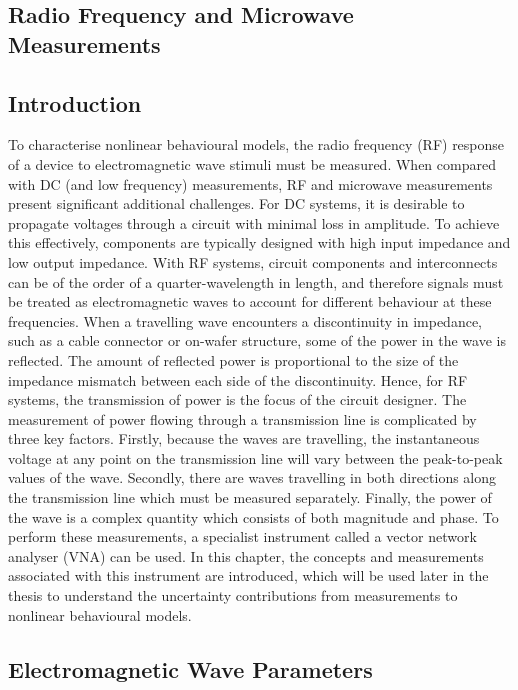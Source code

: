 \documentclass[../thesis.tex]{subfiles}
\begin{document}
\begin{refsection}
\setcounter{chapter}{1}
\chapter{Radio Frequency and Microwave \\Measurements}
\section{Introduction}

To characterise nonlinear behavioural models, the radio frequency (RF) response of a device to electromagnetic wave stimuli must be measured. When compared with DC (and low frequency) measurements, RF and microwave measurements present significant additional challenges. 
For DC systems, it is desirable to propagate voltages through a circuit with minimal loss in amplitude. To achieve this effectively, components are typically designed with high input impedance and low output impedance. With RF systems, circuit components and interconnects can be of the order of a quarter-wavelength in length, and therefore signals must be treated as electromagnetic waves to account for different behaviour at these frequencies.
When a travelling wave encounters a discontinuity in impedance, such as a cable connector or on-wafer structure, some of the power in the wave is reflected. The amount of reflected power is proportional to the size of the impedance mismatch between each side of the discontinuity. Hence, for RF systems, the transmission of power is the focus of the circuit designer. The measurement of power flowing through a transmission line is complicated by three key factors. Firstly, because the waves are travelling, the instantaneous voltage at any point on the transmission line will vary between the peak-to-peak values of the wave. Secondly, there are waves travelling in both directions along the transmission line which must be measured separately. Finally, the power of the wave is a complex quantity which consists of both magnitude and phase.
To perform these measurements, a specialist instrument called a vector network analyser (VNA) can be used. In this chapter, the concepts and measurements associated with this instrument are introduced, which will be used later in the thesis to understand the uncertainty contributions from measurements to nonlinear behavioural models.

\section{Electromagnetic Wave Parameters}

\end{refsection}
\end{document}
